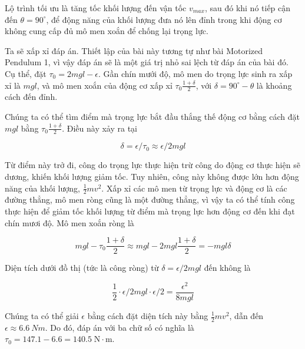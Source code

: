 \begin{solution}
    Lộ trình tối ưu là tăng tốc khối lượng đến vận tốc $v_{max}$, sau đó khi nó tiếp cận đến $\theta=90^{\circ}$, để động năng của khối lượng đưa nó lên đỉnh trong khi động cơ không cung cấp đủ mô men xoắn để chống lại trọng lực. 

    Ta sẽ xấp xỉ đáp án. Thiết lập của bài này tương tự như bài Motorized Pendulum 1, vì vậy đáp án sẽ là một giá trị nhỏ sai lệch từ đáp án của bài đó. Cụ thể, đặt $\tau_0 = 2mgl-\epsilon $. Gần chín mưới độ, mô men do trọng lực sinh ra xấp xỉ là $mgl$, và mô men xoắn của động cơ xấp xỉ $\tau_0 \frac{1+\delta}{2}$, với $\delta=90^{\circ} - \theta$ là khoảng cách đến đỉnh.

   Chúng ta có thể tìm điểm mà trọng lực bắt đầu thắng thế động cơ bằng cách đặt $mgl$ bằng $\tau_0 \frac{1+\delta}{2}$. Điều này xảy ra tại
    
    $$\delta=\epsilon/\tau_0 \approx \epsilon/2mgl$$
    
   Từ điểm này trở đi, công do trọng lực thực hiện trừ công do động cơ thực hiện sẽ dương, khiến khối lượng giảm tốc. Tuy nhiên, công này không được lớn hơn động năng của khối lượng, $\frac{1}{2}mv^2$. Xấp xỉ các mô men từ trọng lực và động cơ là các đường thẳng, mô men ròng cũng là một đường thẳng, vì vậy ta có thể tính công thực hiện để giảm tốc khối lượng từ điểm mà trọng lực hơn động cơ đến khi đạt chín mươi độ. Mô men xoắn ròng là 

    $$mgl-\tau_0 \frac{1+\delta}{2}\approx mgl-2mgl \frac{1+\delta}{2}=-mgl \delta $$

    Diện tích dưới đồ thị (tức là công ròng) từ $\delta=\epsilon/2mgl$ đến không là 

    $$\frac{1}{2} \cdot \epsilon/2mgl \cdot \epsilon/2 = \frac{\epsilon^2}{8mgl} $$

   Chúng ta có thể giải $\epsilon$ bằng cách đặt diện tích này bằng $\frac{1}{2} mv^2$, dẫn đến $\epsilon\approx6.6\ Nm$. Do đó, đáp án với ba chữ số có nghĩa là $\boxed{\tau_0=147.1-6.6=140.5 \;\mathrm{N\cdot m}}$.
    

\end{solution}

